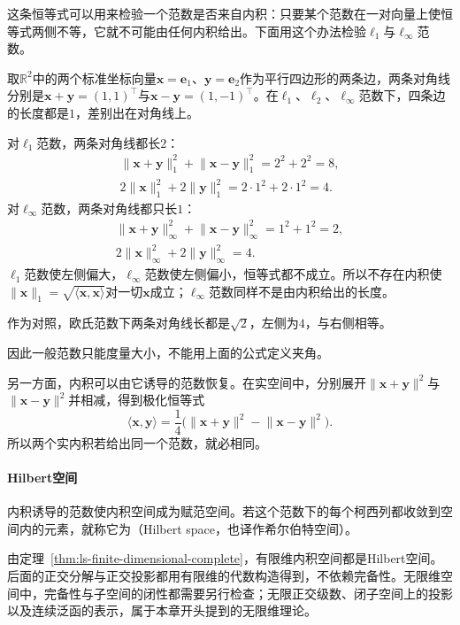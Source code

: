 这条恒等式可以用来检验一个范数是否来自内积：只要某个范数在一对向量上使恒等式两侧不等，它就不可能由任何内积给出。下面用这个办法检验$\ell_1$与$\ell_\infty$范数。
\begin{example}
\label{ex:ls-l1-linf-not-inner-product}
取$\mathbb R^2$中的两个标准坐标向量$\bm x=\bm e_1$、$\bm y=\bm e_2$作为平行四边形的两条边，两条对角线分别是$\bm x+\bm y=(1,1)^\top$与$\bm x-\bm y=(1,-1)^\top$。在$\ell_1$、$\ell_2$、$\ell_\infty$范数下，四条边的长度都是$1$，差别出在对角线上。

对$\ell_1$范数，两条对角线都长$2$：
\[
 \begin{gathered}
 \lVert\bm x+\bm y\rVert_1^2+\lVert\bm x-\bm y\rVert_1^2=2^2+2^2=8,\\
 2\lVert\bm x\rVert_1^2+2\lVert\bm y\rVert_1^2=2\cdot1^2+2\cdot1^2=4.
 \end{gathered}
\]
对$\ell_\infty$范数，两条对角线都只长$1$：
\[
 \begin{gathered}
 \lVert\bm x+\bm y\rVert_\infty^2+\lVert\bm x-\bm y\rVert_\infty^2=1^2+1^2=2,\\
 2\lVert\bm x\rVert_\infty^2+2\lVert\bm y\rVert_\infty^2=4.
 \end{gathered}
\]
$\ell_1$范数使左侧偏大，$\ell_\infty$范数使左侧偏小，恒等式都不成立。所以不存在内积使$\lVert\bm x\rVert_1=\sqrt{\langle\bm x,\bm x\rangle}$对一切$\bm x$成立；$\ell_\infty$范数同样不是由内积给出的长度。

作为对照，欧氏范数下两条对角线长都是$\sqrt2$，左侧为$4$，与右侧相等。
\end{example}
因此一般范数只能度量大小，不能用上面的公式定义夹角。

另一方面，内积可以由它诱导的范数恢复。在实空间中，分别展开$\lVert\bm x+\bm y\rVert^2$与$\lVert\bm x-\bm y\rVert^2$并相减，得到极化恒等式
\begin{equation}
 \langle\bm x,\bm y\rangle=\frac14\bigl(\lVert\bm x+\bm y\rVert^2-\lVert\bm x-\bm y\rVert^2\bigr).
 \label{eq:ls-polarization-identity}
\end{equation}
所以两个实内积若给出同一个范数，就必相同。

\paragraph{Hilbert空间}
\label{sec:ls-hilbert-spaces}
内积诱导的范数使内积空间成为赋范空间。若这个范数下的每个柯西列都收敛到空间内的元素，就称它为（Hilbert space，也译作希尔伯特空间）。

由定理~\ref{thm:ls-finite-dimensional-complete}，有限维内积空间都是Hilbert空间。后面的正交分解与正交投影都用有限维的代数构造得到，不依赖完备性。无限维空间中，完备性与子空间的闭性都需要另行检查；无限正交级数、闭子空间上的投影以及连续泛函的表示，属于本章开头提到的无限维理论。
